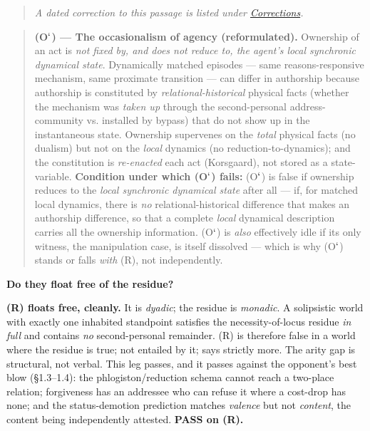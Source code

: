 \documentclass[11pt]{article}
\begin{document}
\begin{quote}\small\emph{A dated correction to this passage is listed under \hyperref[corrections]{Corrections}.}\end{quote}

\begin{quote}
\textbf{(O\ensuremath{`}) — The occasionalism of agency (reformulated).} Ownership of an act is \emph{not fixed by, and does not reduce to, the agent's local synchronic dynamical state}. Dynamically matched episodes — same reasons-responsive mechanism, same proximate transition — can differ in authorship because authorship is constituted by \emph{relational-historical} physical facts (whether the mechanism was \emph{taken up} through the second-personal address-community vs. installed by bypass) that do not show up in the instantaneous state. Ownership supervenes on the \emph{total} physical facts (no dualism) but not on the \emph{local} dynamics (no reduction-to-dynamics); and the constitution is \emph{re-enacted} each act (Korsgaard), not stored as a state-variable. \textbf{Condition under which (O\ensuremath{`}) fails:} (O\ensuremath{`}) is false if ownership reduces to the \emph{local synchronic dynamical state} after all — if, for matched local dynamics, there is \emph{no} relational-historical difference that makes an authorship difference, so that a complete \emph{local} dynamical description carries all the ownership information. (O\ensuremath{`}) is \emph{also} effectively idle if its only witness, the manipulation case, is itself dissolved — which is why (O\ensuremath{`}) stands or falls \emph{with} (R), not independently.
\end{quote}

\textbf{Do they float free of the residue?}

\textbf{(R) floats free, cleanly.} It is \emph{dyadic}; the residue is \emph{monadic}. A solipsistic world with exactly one inhabited standpoint satisfies the necessity-of-locus residue \emph{in full} and contains \emph{no} second-personal remainder. (R) is therefore false in a world where the residue is true; not entailed by it; says strictly more. The arity gap is structural, not verbal. This leg passes, and it passes against the opponent's best blow (§1.3–1.4): the phlogiston/\allowbreak{}reduction schema cannot reach a two-place relation; forgiveness has an addressee who can refuse it where a cost-drop has none; and the status-demotion prediction matches \emph{valence} but not \emph{content}, the content being independently attested. \textbf{PASS on (R).}
\end{document}
